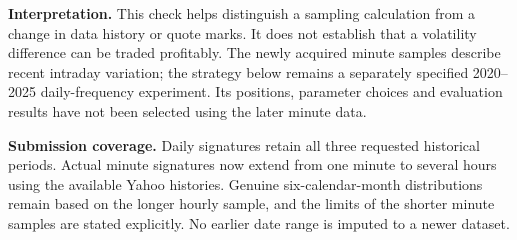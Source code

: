 \textbf{Interpretation.} This check helps distinguish a sampling calculation from a change in data history or quote marks. It does not establish that a volatility difference can be traded profitably. The newly acquired minute samples describe recent intraday variation; the strategy below remains a separately specified 2020--2025 daily-frequency experiment. Its positions, parameter choices and evaluation results have not been selected using the later minute data.

\textbf{Submission coverage.} Daily signatures retain all three requested historical periods. Actual minute signatures now extend from one minute to several hours using the available Yahoo histories. Genuine six-calendar-month distributions remain based on the longer hourly sample, and the limits of the shorter minute samples are stated explicitly. No earlier date range is imputed to a newer dataset.
